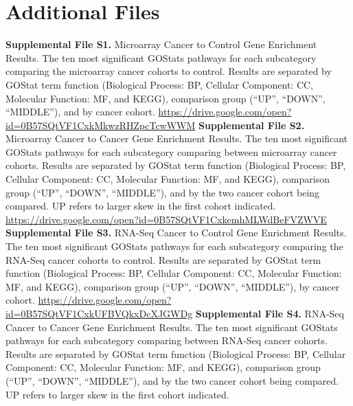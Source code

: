 \documentclass[11pt]{article}
\begin{document}
\section*{Additional Files} 

\textbf{Supplemental File S1.} Microarray Cancer to Control Gene Enrichment Results. The ten most significant GOStats pathways for each subcategory comparing the microarray cancer cohorts to control. Results are separated by GOStat term function (Biological Process: BP, Cellular Component: CC, Molecular Function: MF, and KEGG), comparison group (“UP”, “DOWN”, “MIDDLE”), and  by cancer cohort. 
\newline
\newline
\href{https://drive.google.com/open?id=0B57SQtVF1CxkMkwzRHZpcTcwWWM}{https://drive.google.com/open?id=0B57SQtVF1CxkMkwzRHZpcTcwWWM}
\newline
\newline
\textbf{Supplemental File S2.} Microarray Cancer to Cancer Gene Enrichment Results. The ten most significant GOStats pathways for each subcategory comparing between microarray cancer cohorts. Results are separated by GOStat term function (Biological Process: BP, Cellular Component: CC, Molecular Function: MF, and KEGG), comparison group (“UP”, “DOWN”, “MIDDLE”), and by the two cancer cohort being compared. UP refers to larger skew in the first cohort indicated. 
\newline
\newline
\href{https://drive.google.com/open?id=0B57SQtVF1CxkemhMLWdBeFVZWVE}{https://drive.google.com/open?id=0B57SQtVF1CxkemhMLWdBeFVZWVE}
\newline
\newline
\textbf{Supplemental File S3.} RNA-Seq Cancer to Control Gene Enrichment Results. The ten most significant GOStats pathways for each subcategory comparing the RNA-Seq cancer cohorts to control. Results are separated by GOStat term function (Biological Process: BP, Cellular Component: CC, Molecular Function: MF, and KEGG), comparison group (“UP”, “DOWN”, “MIDDLE”), by cancer cohort.
\newline
\newline
\href{https://drive.google.com/open?id=0B57SQtVF1CxkUFBVQkxDcXJGWDg}{https://drive.google.com/open?id=0B57SQtVF1CxkUFBVQkxDcXJGWDg}
\newline
\newline
\textbf{Supplemental File S4.} RNA-Seq Cancer to Cancer Gene Enrichment Results. The ten most significant GOStats pathways for each subcategory comparing between RNA-Seq cancer cohorts. Results are separated by GOStat term function (Biological Process: BP, Cellular Component: CC, Molecular Function: MF, and KEGG), comparison group (“UP”, “DOWN”, “MIDDLE”), and by the two cancer cohort being compared. UP refers to larger skew in the first cohort indicated. 
\end{document}
